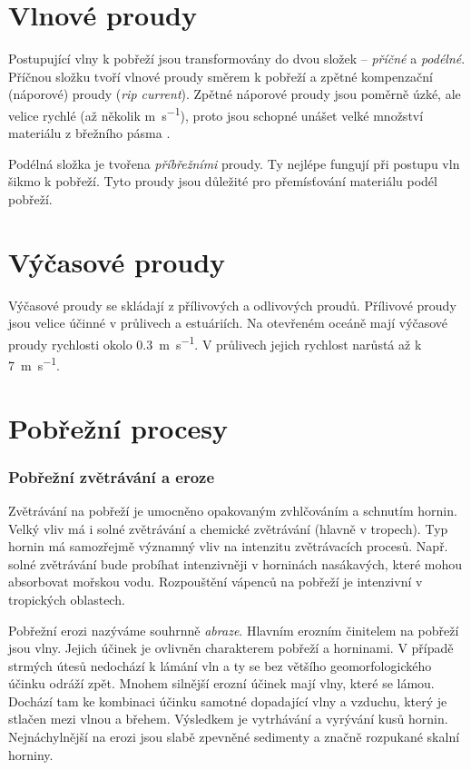\section{Vlnové proudy}
Postupující vlny k pobřeží jsou transformovány do dvou složek -- \emph{příčné} a \emph{podélné}. Příčnou složku tvoří vlnové proudy směrem k pobřeží a zpětné kompenzační (náporové) proudy (\textit{rip current}). Zpětné náporové proudy jsou poměrně úzké, ale velice rychlé (až několik \si{\metre\per\second}), proto jsou schopné unášet velké množství materiálu z břežního pásma \parencite{demekObecnaGeomorfologie1987}. 

Podélná složka je tvořena \emph{příbřežními} proudy. Ty nejlépe fungují při postupu vln šikmo k pobřeží. Tyto proudy jsou důležité pro přemísťování materiálu podél pobřeží.

\section{Výčasové proudy}
Výčasové proudy se skládají z přílivových a odlivových proudů. Přílivové proudy jsou velice účinné v průlivech a estuáriích. Na otevřeném oceáně mají výčasové proudy rychlosti okolo \SI{0,3}{\metre\per\second}. V průlivech jejich rychlost narůstá až k \SI{7}{\metre\per\second}.

\section{Pobřežní procesy}
\subsubsection{Pobřežní zvětrávání a eroze}
Zvětrávání na pobřeží je umocněno opakovaným zvhlčováním a schnutím hornin. Velký vliv má i solné zvětrávání a chemické zvětrávání (hlavně v tropech). Typ hornin má samozřejmě významný vliv na intenzitu zvětrávacích procesů. Např. solné zvětrávání bude probíhat intenzivněji v horninách nasákavých, které mohou absorbovat mořskou vodu. Rozpouštění vápenců na pobřeží je intenzivní v tropických oblastech.

Pobřežní erozi nazýváme souhrnně \emph{abraze}. Hlavním erozním činitelem na pobřeží jsou vlny. Jejich účinek je ovlivněn charakterem pobřeží a horninami. V případě strmých útesů nedochází k lámání vln a ty se bez většího geomorfologického účinku odráží zpět. Mnohem silnější erozní účinek mají vlny, které se lámou. Dochází tam ke kombinaci účinku samotné dopadající vlny a vzduchu, který je stlačen mezi vlnou a břehem. Výsledkem je vytrhávání a vyrývání kusů hornin. Nejnáchylnější na erozi jsou slabě zpevněné sedimenty a značně rozpukané skalní horniny.

